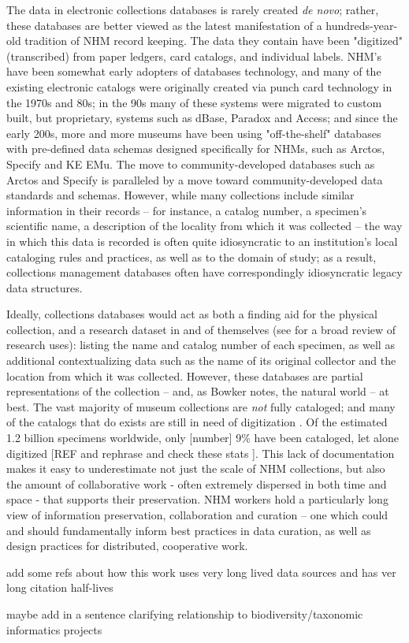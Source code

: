 The data in electronic collections databases is rarely created \textit{de novo}; rather, these databases are better viewed as the latest manifestation of a hundreds-year-old tradition of NHM record keeping. The data they contain have been "digitized" (transcribed) from paper ledgers, card catalogs, and individual labels. NHM's have been somewhat early adopters of databases technology, and many of the existing electronic catalogs were originally created via punch card technology in the 1970s and 80s; in the 90s many of these systems were migrated to custom built, but proprietary, systems such as dBase, Paradox and Access; and since the early 200s, more and more museums have been using "off-the-shelf" databases with pre-defined data schemas designed specifically for NHMs, such as Arctos, Specify and KE EMu. The move to community-developed databases such as Arctos and Specify is paralleled by a move toward community-developed data standards and schemas.  However, while many collections include similar information in their records – for instance, a catalog number, a specimen’s scientific name, a description of the locality from which it was collected – the way in which this data is recorded is often quite idiosyncratic to an institution’s local cataloging rules and practices, as well as to the domain of study; as a result, collections management databases often have correspondingly idiosyncratic legacy data structures.

Ideally, collections databases would act as both a finding aid for the physical collection, and a research dataset in and of themselves (see \cite{Chapman2005} for a broad review of research uses): listing the name and catalog number of each specimen, as well as additional contextualizing data such as the name of its original collector and the location from which it was collected. However, these databases are partial representations of the collection -- and, as Bowker notes, the natural world \cite{Bowker_2000} -- at best. The vast majority of museum collections are \textit{not} fully cataloged; and many of the catalogs that do exists are still in need of digitization \cite{Beaman_2012}. Of the estimated 1.2 billion specimens worldwide, only [number] 9\% have been cataloged, let alone digitized [REF and rephrase and check these stats \cite{Ari_o_2010}]. This lack of documentation makes it easy to underestimate not just the scale of NHM collections, but also the amount of collaborative work  - often extremely dispersed in both time and space - that supports their preservation. NHM workers hold a particularly long view of information preservation, collaboration and curation -- one which could and should fundamentally inform best practices in data curation, as well as design practices for distributed, cooperative work.

add some refs about how this work uses very long lived data sources and has ver long citation half-lives

maybe add in a sentence clarifying relationship to biodiversity/taxonomic informatics projects
